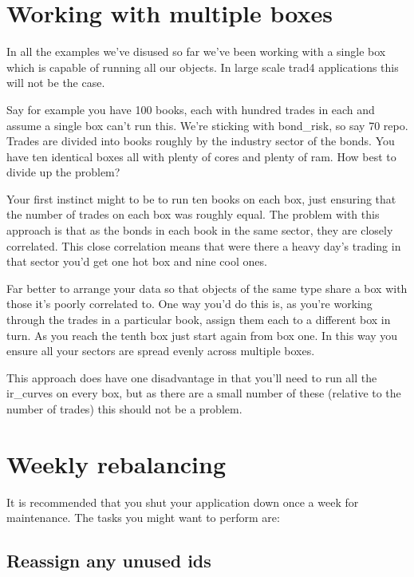 \documentclass{report}
\begin{document}
\section{Working with multiple boxes}

In all the examples we've disused so far we've been working with a single box which is capable of running  all our objects. In large scale trad4 applications this will not be the case.

Say for example you have 100 books, each with hundred trades in each and assume a single box can't run this. We're sticking with bond_risk, so say 70%
repo. Trades are divided into books roughly by the industry sector of the bonds. You have ten identical boxes all with plenty of cores and plenty of ram. How best to divide up the problem?

Your first instinct might to be to run ten books on each box, just ensuring that the number of trades on each box was roughly equal. The problem with this approach is that as the bonds in each book in the same sector, they are closely correlated. This close correlation means that were there a heavy day's trading in that sector you'd get one hot box and nine cool ones.

Far better to arrange your data so that objects of the same type share a box with those it's poorly correlated to. One way you'd do this is, as you're working through the trades in a particular book, assign them each to a different box in turn. As you reach the tenth box just start again from box one. In this way you ensure all your sectors are spread evenly across multiple boxes.

This approach does have one disadvantage in that you'll need to run all the ir_curves on every box, but as there are a small number of these (relative to the number of trades) this should not be a problem.

\section{Weekly rebalancing}

It is recommended that you shut your application down once a week for maintenance. The tasks you might want to perform are:

\subsection{Reassign any unused ids}
\end{document}
